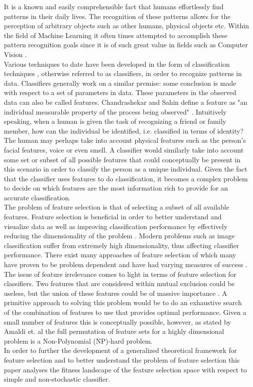 \documentclass[journal,comsoc]{IEEEtran}
\begin{document}
It is a known and easily comprehensible fact that humans effortlessly find patterns in their daily lives. The recognition of these patterns allows for the perception of arbitrary objects such as other humans, physical objects etc. Within the field of Machine Learning it often times attempted to accomplish these pattern recognition goals \cite{simon2013too} since it is of such great value in fields such as Computer Vision  \cite{wernick2010machine}.\\
Various techniques to date have been developed in the form of classification techniques \cite{nguyen2008survey} , otherwise referred to as classifiers, in order to recognize patterns in data. Classifiers generally work on a similar premise: some conclusion is made with respect to a set of parameters in data. These parameters in the observed data can also be called features. Chandrashekar and Sahin define a feature as "an individual measurable property of the process being observed" \cite{chandrashekar2014survey}. Intuitively speaking, when a human is given the task of recognizing a friend or family member, how can the individual be identified, i.e. classified in terms of identity? The human may perhaps take into account physical features such as the person's facial features, voice or even smell. A classifier would similarly take into account some set or subset of all possible features that could conceptually be present in this scenario in order to classify the person as a unique individual. Given the fact that the classifier uses features to do classification, it becomes a complex problem to decide on which features are the most information rich to provide for an accurate classification.\\
The problem of feature selection is that of selecting a subset of all available features. Feature selection is beneficial in order to better understand and visualize data as well as improving classification performance by effectively reducing the dimensionality of the problem \cite{guyon2003introduction}. Modern problems such as image classification suffer from extremely high dimensionality, thus affecting classifier performance. There exist many approaches of feature selection of which many have proven to be problem dependent and have had varying measures of success \cite{chandrashekar2014survey}. The issue of feature irrelevance comes to light in terms of feature selection for classifiers. Two features that are considered within mutual exclusion could be useless, but the union of these features could be of massive importance \cite{guyon2003introduction}. A primitive approach to solving this problem would be to do an exhaustive search of the combination of features to use that provides optimal performance. Given a small number of features this is conceptually possible, however, 
 as stated by Amaldi  et. al \cite{amaldi1998approximability} the full permutation of feature sets for a highly dimensional problem is a Non-Polynomial (NP)-hard problem.\\
In order to further the development of a generalized theoretical framework for feature selection and to better understand the problem of feature selection this paper analyses the fitness landscape of the feature selection space with respect to simple and non-stochastic classifier.
\end{document}
